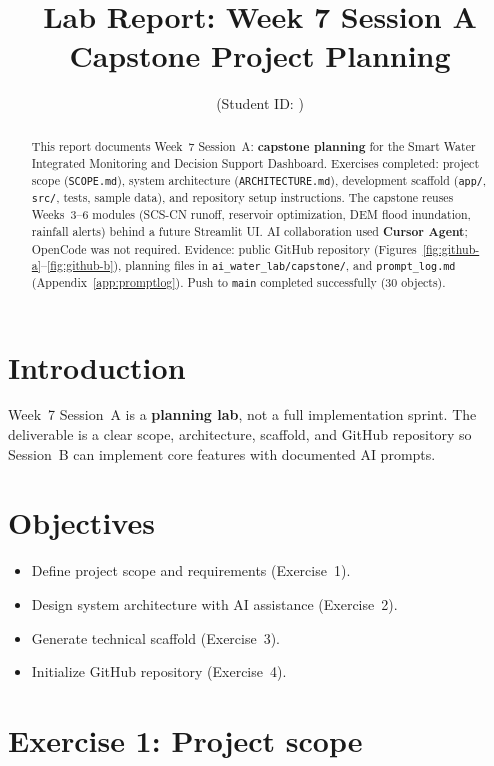 \documentclass[11pt,a4paper]{article}
\title{Lab Report: Week 7 Session A\\Capstone Project Planning}
\author{\studentname \quad (Student ID: \studentid)}
\date{\reportdate}
\begin{document}
\maketitle

\begin{abstract}
This report documents Week~7 Session~A: \textbf{capstone planning} for the Smart Water Integrated Monitoring and Decision Support Dashboard. Exercises completed: project scope (\texttt{SCOPE.md}), system architecture (\texttt{ARCHITECTURE.md}), development scaffold (\texttt{app/}, \texttt{src/}, tests, sample data), and repository setup instructions. The capstone reuses Weeks~3--6 modules (SCS-CN runoff, reservoir optimization, DEM flood inundation, rainfall alerts) behind a future Streamlit UI. AI collaboration used \textbf{Cursor Agent}; OpenCode was not required. Evidence: public GitHub repository (Figures~\ref{fig:github-a}--\ref{fig:github-b}), planning files in \texttt{ai\_water\_lab/capstone/}, and \texttt{prompt\_log.md} (Appendix~\ref{app:promptlog}). Push to \texttt{main} completed successfully (30 objects).
\end{abstract}

\section{Introduction}
Week~7 Session~A is a \textbf{planning lab}, not a full implementation sprint. The deliverable is a clear scope, architecture, scaffold, and GitHub repository so Session~B can implement core features with documented AI prompts.

\section{Objectives}
\begin{itemize}[noitemsep]
  \item Define project scope and requirements (Exercise~1).
  \item Design system architecture with AI assistance (Exercise~2).
  \item Generate technical scaffold (Exercise~3).
  \item Initialize GitHub repository (Exercise~4).
\end{itemize}

\section{Exercise 1: Project scope}
\end{document}
